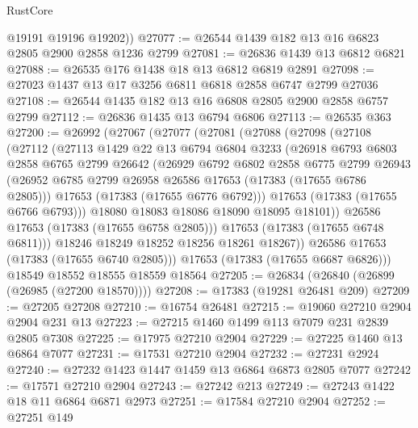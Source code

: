 \begin{lexlean}{RustCore}
\begin{coremodule}
        @19191
        @19196
        @19202))
@27077 := @26544 @1439 @182 @13 @16 @6823 @2805 @2900 @2858 @1236 @2799
@27081 := @26836 @1439 @13 @6812 @6821
@27088 := @26535 @176 @1438 @18 @13 @6812 @6819 @2891
@27098 := @27023 @1437 @13 @17 @3256 @6811 @6818 @2858 @6747 @2799 @27036
@27108 := @26544 @1435 @182 @13 @16 @6808 @2805 @2900 @2858 @6757 @2799
@27112 := @26836 @1435 @13 @6794 @6806
@27113 := @26535 @363
@27200 := @26992
    (@27067
      (@27077
        (@27081
          (@27088
            (@27098
              (@27108
                (@27112
                  (@27113
                    @1429
                    @22
                    @13
                    @6794
                    @6804
                    @3233
                    (@26918
                      @6793
                      @6803
                      @2858
                      @6765
                      @2799
                      @26642
                      (@26929
                        @6792
                        @6802
                        @2858
                        @6775
                        @2799
                        @26943
                        (@26952 @6785 @2799 @26958 @26586 @17653 (@17383 (@17655 @6786 @2805)))
                        @17653
                        (@17383 (@17655 @6776 @6792)))
                      @17653
                      (@17383 (@17655 @6766 @6793)))
                    @18080
                    @18083
                    @18086
                    @18090
                    @18095
                    @18101))
                @26586
                @17653
                (@17383 (@17655 @6758 @2805)))
              @17653
              (@17383 (@17655 @6748 @6811)))
            @18246
            @18249
            @18252
            @18256
            @18261
            @18267))
        @26586
        @17653
        (@17383 (@17655 @6740 @2805)))
      @17653
      (@17383 (@17655 @6687 @6826)))
    @18549
    @18552
    @18555
    @18559
    @18564
@27205 := @26834 (@26840 (@26899 (@26985 (@27200 @18570))))
@27208 := @17383 (@19281 @26481 @209)
@27209 := @27205 @27208
@27210 := @16754 @26481
@27215 := @19060 @27210 @2904 @2904 @231 @13
@27223 := @27215 @1460 @1499 @113 @7079 @231 @2839 @2805 @7308
@27225 := @17975 @27210 @2904
@27229 := @27225 @1460 @13 @6864 @7077
@27231 := @17531 @27210 @2904
@27232 := @27231 @2924
@27240 := @27232 @1423 @1447 @1459 @13 @6864 @6873 @2805 @7077
@27242 := @17571 @27210 @2904
@27243 := @27242 @213
@27249 := @27243 @1422 @18 @11 @6864 @6871 @2973
@27251 := @17584 @27210 @2904
@27252 := @27251 @149

\end{coremodule}
\end{lexlean}
